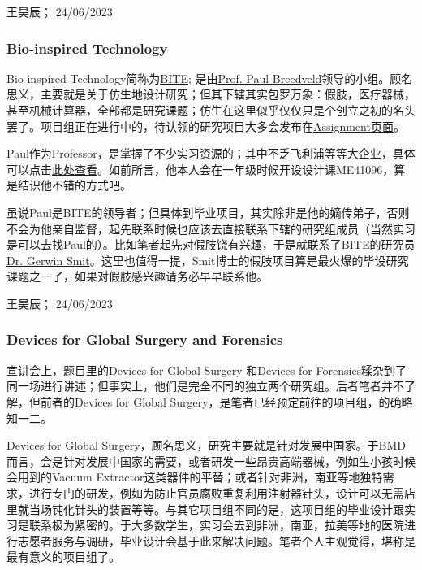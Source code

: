 \begin{flushright}
王昊辰； 24/06/2023
\end{flushright}

\subsubsection{Bio-inspired Technology}
Bio-inspired Technology简称为\href{https://www.bitegroup.nl/}{\uline{BITE}}; 是由\href{https://www.linkedin.com/in/paul-breedveld-b0212b8a?originalSubdomain=nl}{\uline{Prof. Paul Breedveld}}领导的小组。顾名思义，主要就是关于仿生地设计研究；但其下辖其实包罗万象：假肢，医疗器械，甚至机械计算器，全部都是研究课题；仿生在这里似乎仅仅只是个创立之初的名头罢了。项目组正在进行中的，待认领的研究项目大多会发布在\href{https://www.bitegroup.nl/assignments/}{\uline{Assignment页面}}。 

Paul作为Professor，是掌握了不少实习资源的；其中不乏飞利浦等等大企业，具体可以点击\href{https://www.bitegroup.nl/internships/}{\uline{此处查看}}。如前所言，他本人会在一年级时候开设设计课ME41096，算是结识他不错的方式吧。

虽说Paul是BITE的领导者；但具体到毕业项目，其实除非是他的嫡传弟子，否则不会为他亲自监督，起先联系时候也应该去直接联系下辖的研究组成员（当然实习是可以去找Paul的）。比如笔者起先对假肢饶有兴趣，于是就联系了BITE的研究员\href{https://www.bitegroup.nl/people/gerwin-smit/}{Dr. Gerwin Smit}。这里也值得一提，Smit博士的假肢项目算是最火爆的毕设研究课题之一了，如果对假肢感兴趣请务必早早联系他。
\begin{flushright}
王昊辰； 24/06/2023
\end{flushright}

\subsubsection{Devices for Global Surgery and Forensics}
宣讲会上，题目里的Devices for Global Surgery 和Devices for Forensics糅杂到了同一场进行讲述；但事实上，他们是完全不同的独立两个研究组。后者笔者并不了解，但前者的Devices for Global Surgery，是笔者已经预定前往的项目组，的确略知一二。

Devices for Global Surgery，顾名思义，研究主要就是针对发展中国家。于BMD而言，会是针对发展中国家的需要，或者研发一些昂贵高端器械，例如生小孩时候会用到的Vacuum Extractor这类器件的平替；或者针对非洲，南亚等地独特需求，进行专门的研发，例如为防止官员腐败重复利用注射器针头，设计可以无需店里就当场钝化针头的装置等等。与其它项目组不同的是，这项目组的毕业设计跟实习是联系极为紧密的。于大多数学生，实习会去到非洲，南亚，拉美等地的医院进行志愿者服务与调研，毕业设计会基于此来解决问题。笔者个人主观觉得，堪称是最有意义的项目组了。

